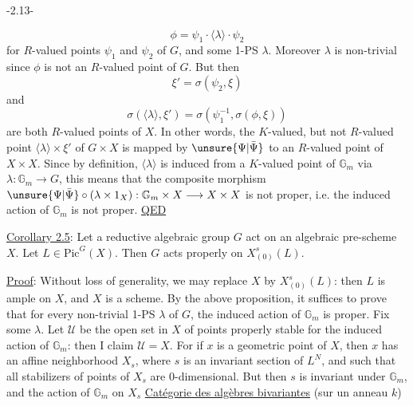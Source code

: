 \begin{center}-2.13-\end{center}
\[
\phi=\psi_1\cdot\langle\lambda\rangle\cdot\psi_2
\]
for $R$-valued points $\psi_1$ and $\psi_2$ of $G$, and some 1-PS $\lambda$. Moreover $\lambda$ is non-trivial since $\phi$ is not an $R$-valued point of $G$. But then
\[
\xi'=\sigma(\psi_2,\xi)
\]
and
\[
\sigma(\langle\lambda\rangle,\xi')=\sigma(\psi_1^{-1},\sigma(\phi,\xi))
\]
are both $R$-valued points of $X$. In other words, the $K$-valued, but not $R$-valued point $\langle\lambda\rangle\times\xi'$ of $G\times X$ is mapped by $\unsure{\Psi|\bar\Psi}$ to an $R$-valued point of $X\times X$. Since by definition, $\langle\lambda\rangle$ is induced from a $K$-valued point of $\mathbb G_m$ via $\lambda:\mathbb G_m\longrightarrow G$, this means that the composite morphism $\unsure{\Psi|\bar\Psi}\circ(\lambda\times1_X):\mathbb G_m\times X\longrightarrow X\times X$ is not proper, i.e. the induced action of $\mathbb G_m$ is not proper. \uline{QED}

\uline{Corollary 2.5}: Let a reductive algebraic group $G$ act on an algebraic pre-scheme $X$. Let $L\in\mathrm{Pic}^G(X)$. Then $G$ acts properly on $X^s_{(0)}(L)$.

\uline{Proof}: Without loss of generality, we may replace $X$ by $X^s_{(0)}(L)$: then $L$ is ample on $X$, and $X$ is a scheme. By the above proposition, it suffices to prove that for every non-trivial 1-PS $\lambda$ of $G$, the induced action of $\mathbb G_m$ is proper. Fix some $\lambda$. Let $\mathcal U$ be the open set in $X$ of points properly stable for the induced action of $\mathbb G_m$: then I claim $\mathcal U=X$. For if $x$ is a geometric point of $X$, then $x$ has an affine neighborhood $X_s$, where $s$ is an invariant section of $L^N$, and such that all stabilizers of points of $X_s$ are 0-dimensional. But then $s$ is invariant under $\mathbb G_m$, and the action of $\mathbb G_m$ on $X_s$
\uline{Catégorie des algèbres bivariantes} (sur un anneau $k$)

